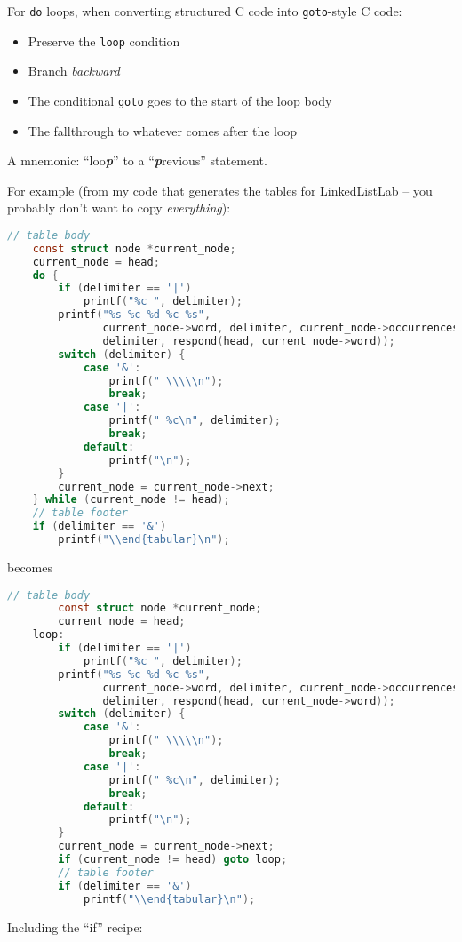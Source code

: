 \documentclass{article}
\begin{document}
For \lstinline{do} loops, when converting structured C code into \lstinline{goto}-style C code:
\begin{itemize}
    \item Preserve the \lstinline{loop} condition
    \item Branch \textit{backward}
    \item The conditional \lstinline{goto} goes to the start of the loop body
    \item The fallthrough to whatever comes after the loop
\end{itemize}
A mnemonic: ``loo\textbf{\textit{p}}'' to a ``\textbf{\textit{p}}revious'' statement.

For example (from my code that generates the tables for LinkedListLab -- you probably don't want to copy \textit{everything}):

\begin{lstlisting}[language=C]
    // table body
    const struct node *current_node;
    current_node = head;
    do {
        if (delimiter == '|')
            printf("%c ", delimiter);
        printf("%s %c %d %c %s",
               current_node->word, delimiter, current_node->occurrences,
               delimiter, respond(head, current_node->word));
        switch (delimiter) {
            case '&':
                printf(" \\\\\n");
                break;
            case '|':
                printf(" %c\n", delimiter);
                break;
            default:
                printf("\n");
        }
        current_node = current_node->next;
    } while (current_node != head);
    // table footer
    if (delimiter == '&')
        printf("\\end{tabular}\n");
\end{lstlisting}
\newpage
becomes

\begin{lstlisting}[language=C]
        // table body
        const struct node *current_node;
        current_node = head;
    loop:
        if (delimiter == '|')
            printf("%c ", delimiter);
        printf("%s %c %d %c %s",
               current_node->word, delimiter, current_node->occurrences,
               delimiter, respond(head, current_node->word));
        switch (delimiter) {
            case '&':
                printf(" \\\\\n");
                break;
            case '|':
                printf(" %c\n", delimiter);
                break;
            default:
                printf("\n");
        }
        current_node = current_node->next;
        if (current_node != head) goto loop;
        // table footer
        if (delimiter == '&')
            printf("\\end{tabular}\n");
\end{lstlisting}
\newpage
Including the ``if'' recipe:
\end{document}
